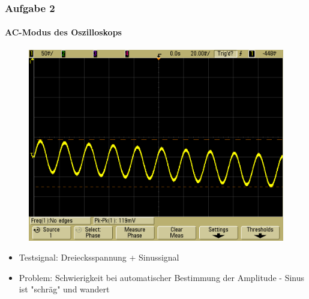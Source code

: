 \begin{frame}
\frametitle{Aufgabe 2}
\framesubtitle{AC-Modus des Oszilloskops}
\begin{figure}[H]
\begin{center}
        \includegraphics[scale=0.2]{./img/2c_Testsignal_1.png}
\end{center}
\end{figure}
\begin{itemize}
    \item Testsignal: Dreiecksspannung + Sinussignal
    \item Problem: Schwierigkeit bei automatischer Bestimmung der
    Amplitude - Sinus ist "schräg" und wandert
\end{itemize}
\end{frame}

